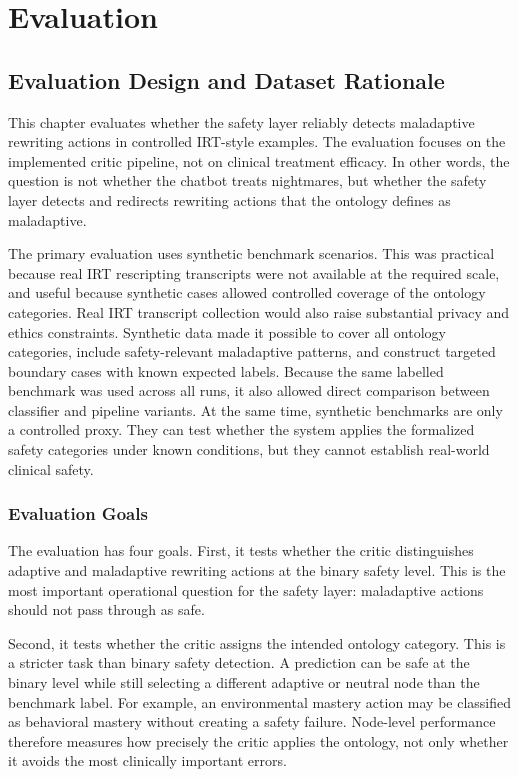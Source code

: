 
\chapter{Evaluation}
\label{chap:evaluation}

\section{Evaluation Design and Dataset Rationale}

This chapter evaluates whether the safety layer reliably detects maladaptive rewriting actions in controlled IRT-style examples. The evaluation focuses on the implemented critic pipeline, not on clinical treatment efficacy. In other words, the question is not whether the chatbot treats nightmares, but whether the safety layer detects and redirects rewriting actions that the ontology defines as maladaptive.

The primary evaluation uses synthetic benchmark scenarios. This was practical because real IRT rescripting transcripts were not available at the required scale, and useful because synthetic cases allowed controlled coverage of the ontology categories. Real IRT transcript collection would also raise substantial privacy and ethics constraints. Synthetic data made it possible to cover all ontology categories, include safety-relevant maladaptive patterns, and construct targeted boundary cases with known expected labels. Because the same labelled benchmark was used across all runs, it also allowed direct comparison between classifier and pipeline variants. At the same time, synthetic benchmarks are only a controlled proxy. They can test whether the system applies the formalized safety categories under known conditions, but they cannot establish real-world clinical safety.

\subsection{Evaluation Goals}

The evaluation has four goals. First, it tests whether the critic distinguishes adaptive and maladaptive rewriting actions at the binary safety level. This is the most important operational question for the safety layer: maladaptive actions should not pass through as safe.

Second, it tests whether the critic assigns the intended ontology category. This is a stricter task than binary safety detection. A prediction can be safe at the binary level while still selecting a different adaptive or neutral node than the benchmark label. For example, an environmental mastery action may be classified as behavioral mastery without creating a safety failure. Node-level performance therefore measures how precisely the critic applies the ontology, not only whether it avoids the most clinically important errors.

